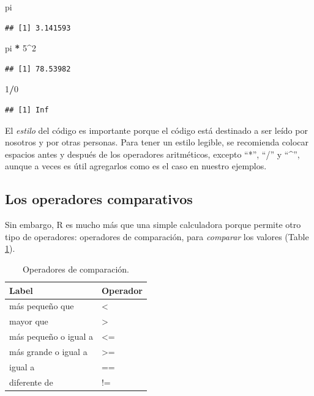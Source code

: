 \documentclass[
]{book}
\newenvironment{Shaded}{\begin{snugshade}}{\end{snugshade}}
\newcommand{\DecValTok}[1]{\textcolor[rgb]{0.00,0.00,0.81}{#1}}
\newcommand{\NormalTok}[1]{#1}
\newcommand{\OperatorTok}[1]{\textcolor[rgb]{0.81,0.36,0.00}{\textbf{#1}}}
\newcommand{\StringTok}[1]{\textcolor[rgb]{0.31,0.60,0.02}{#1}}
\begin{document}
\begin{Shaded}
\begin{Highlighting}[]
\NormalTok{pi}
\end{Highlighting}
\end{Shaded}

\begin{verbatim}
## [1] 3.141593
\end{verbatim}

\begin{Shaded}
\begin{Highlighting}[]
\NormalTok{pi }\OperatorTok{*}\StringTok{ }\DecValTok{5}\OperatorTok{^}\DecValTok{2}
\end{Highlighting}
\end{Shaded}

\begin{verbatim}
## [1] 78.53982
\end{verbatim}

\begin{Shaded}
\begin{Highlighting}[]
\DecValTok{1}\OperatorTok{/}\DecValTok{0}
\end{Highlighting}
\end{Shaded}

\begin{verbatim}
## [1] Inf
\end{verbatim}

El \emph{estilo} del código es importante porque el código está destinado a ser leído por nosotros y por otras personas. Para tener un estilo legible, se recomienda colocar espacios antes y después de los operadores aritméticos, excepto ``*'', ``/'' y ``\^{}'', aunque a veces es útil agregarlos como es el caso en nuestro ejemplos.

\hypertarget{l011opcomp}{%
\subsection{Los operadores comparativos}\label{l011opcomp}}

Sin embargo, R es mucho más que una simple calculadora porque permite otro tipo de operadores: operadores de comparación, para \emph{comparar} los valores (Table \ref{tab:tabOpCom}).

\begin{table}

\caption{\label{tab:tabOpCom}Operadores de comparación.\label{tab:tabOpCom}}
\centering
\begin{tabular}[t]{l|l}
\hline
Label & Operador\\
\hline
más pequeño que & <\\
\hline
mayor que & >\\
\hline
más pequeño o igual a & <=\\
\hline
más grande o igual a & >=\\
\hline
igual a & ==\\
\hline
diferente de & !=\\
\hline
\end{tabular}
\end{table}
\end{document}
